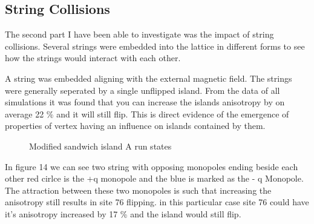 \subsection{String Collisions}
The second part I have been able to investigate was the impact of string collisions.  Several strings were embedded into the lattice in different forms to see how the strings would interact with each other.
\par
A string was embedded aligning with the external magnetic field.  The strings were generally seperated by a single unflipped island.  From the data of all simulations it was found that you can increase the islands anisotropy by on average 22 \% and it will still flip.  This is direct evidence of the emergence of properties of vertex having an influence on islands contained by them.
\clearpage
\begin{figure}[ht!]
    \begin{center}
\qquad
        \caption[Modified sandwich island A run states]{Modified sandwich island A run states}
        \label{fig:gf13}
    \end{center}
\end{figure}
In figure 14 we can see two string with opposing monopoles ending beside each other red cirlce is the +q monopole and the blue is marked as the - q Monopole.  The attraction between these two monopoles is such that increasing the anisotropy still results in site 76 flipping.  in this particular case site 76 could have it's anisotropy increased by 17 \% and the island would still flip.
\par
